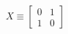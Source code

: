 \documentclass[preview]{standalone}
\begin{document}
\begin{align*}
X \equiv \begin{bmatrix} 0 & 1 \\ 1 & 0 \end{bmatrix}
\end{align*}
\end{document}
